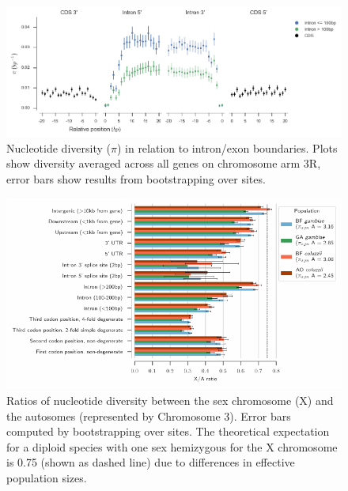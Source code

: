 \documentclass[a4paper,11pt,abstracton,hidelinks]{scrartcl}
\begin{document}
\clearpage
\begin{figure}[h]
\centering
\includegraphics[width=1.1\textwidth,center]{artwork/chapter3/splicing_pi.png}
\caption{Nucleotide diversity ($\pi$) in relation to intron/exon boundaries.
%
Plots show diversity averaged across all genes on chromosome arm 3R, error bars show results from bootstrapping over sites.
}
%
\label{fig:splicing_pi}
\end{figure}


\clearpage
\begin{figure}[h]
\centering
\includegraphics[width=1.1\textwidth,center]{artwork/chapter3/feature_pi_ratios.pdf}
\caption{Ratios of nucleotide diversity between the sex chromosome (X) and the autosomes (represented by Chromosome 3).
%
Error bars computed by bootstrapping over sites.
%
The theoretical expectation for a diploid species with one sex hemizygous for the X chromosome is 0.75 (shown as dashed line) due to differences in effective population sizes.
}
%
\label{fig:feature_pi_ratios}
\end{figure}


\clearpage
\end{document}
